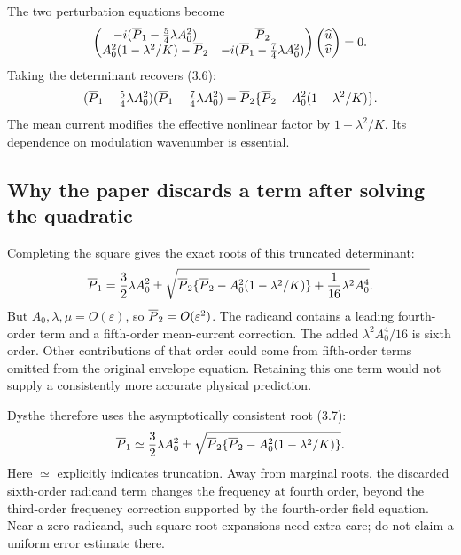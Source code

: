 The two perturbation equations become
\begin{equation}\label{eq:dysthe-matrix}
 \begin{pmatrix}
 -i(\overline{P}_1-\frac54\lambda A_0^2)&\overline{P}_2\\
 A_0^2(1-\lambda^2/K)-\overline{P}_2&-i(\overline{P}_1-\frac74\lambda A_0^2)
 \end{pmatrix}
 \begin{pmatrix}\widehat u\\\widehat v\end{pmatrix}=0.
\end{equation}
Taking the determinant recovers (3.6):
\begin{equation}\label{eq:dysthe-det}
 (\overline{P}_1-\tfrac54\lambda A_0^2)(\overline{P}_1-\tfrac74\lambda A_0^2)
 =\overline{P}_2\{\overline{P}_2-A_0^2(1-\lambda^2/K)\}.
\end{equation}
The mean current modifies the effective nonlinear factor by
$1-\lambda^2/K$. Its dependence on modulation wavenumber is essential.

\subsection{Why the paper discards a term after solving the quadratic}
Completing the square gives the exact roots of this truncated determinant:
\begin{equation}\label{eq:exact-root-truncated}
 \overline{P}_1=\frac32\lambda A_0^2
 \mathbin{\pm}
 \sqrt{\overline{P}_2\{\overline{P}_2-A_0^2(1-\lambda^2/K)\}
              +\frac1{16}\lambda^2A_0^4}.
\end{equation}
But $A_0,\lambda,\mu=O(\varepsilon)$, so $\overline{P}_2=O(\varepsilon^2)$.
The radicand contains a leading fourth-order term and a fifth-order
mean-current correction. The added $\lambda^2A_0^4/16$ is sixth order.
Other contributions of that order could come from fifth-order terms
omitted from the original envelope equation. Retaining this one term
would not supply a consistently more accurate physical prediction.

Dysthe therefore uses the asymptotically consistent root (3.7):
\begin{equation}\label{eq:consistent-root}
 \overline{P}_1\simeq\frac32\lambda A_0^2
 \mathbin{\pm}\sqrt{\overline{P}_2\{\overline{P}_2-A_0^2(1-\lambda^2/K)\}}.
\end{equation}
Here $\simeq$ explicitly indicates truncation. Away from marginal roots,
the discarded sixth-order radicand term changes the frequency at fourth
order, beyond the third-order frequency correction supported by the
fourth-order field equation. Near a zero radicand, such square-root
expansions need extra care; do not claim a uniform error estimate there.

